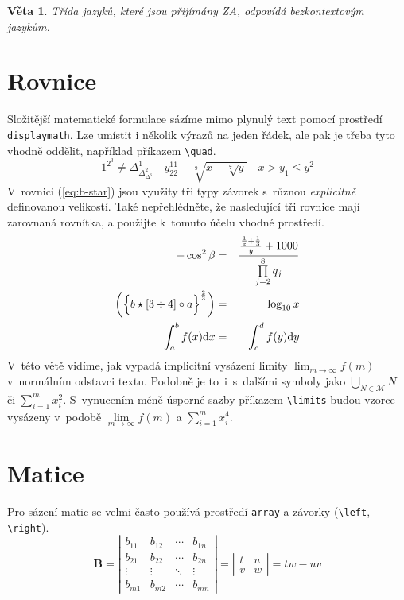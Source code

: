 \documentclass[a4paper, twocolumn, 11pt]{article}
\theoremstyle{plain}
\newtheorem{theorem}{Věta}
\begin{document}
\begin{theorem}

	Třída jazyků, které jsou přijímány ZA, odpovídá \emph{bezkontextovým jazykům.}

\end{theorem}

\section{Rovnice}

Složitější matematické formulace sázíme mimo plynulý text pomocí prostředí \texttt{displaymath}.
Lze umístit i několik výrazů na jeden řádek, ale pak je třeba tyto vhodně oddělit,
například příkazem \verb|\quad|.
%
\begin{displaymath}
	1^{2^3} \neq \Delta^1_{\Delta^2_{\Delta^3}} \quad
	y_{22}^{11} - \sqrt[9]{x + \sqrt[7]{y}} \quad
	x > y_1 \leq y^2
\end{displaymath}
%
\noindent
V~rovnici (\ref{eq:b-star}) jsou využity tři typy závorek s~různou \emph{explicitně} definovanou
velikostí. Také nepřehlédněte, že nasledující tři rovnice mají zarovnaná rovnítka, a použijte
k~tomuto účelu vhodné prostředí.
%
\begin{eqnarray}
	- \cos^2 \beta & = & \frac{\frac{\frac{1}{x} + \frac{1}{3}}{y} + 1000}{\prod\limits_{j=2}^8 q_j} \\
	\label{eq:b-star} \biggl( {\Bigl\{ b \star \left[ 3 \div 4 \right] \circ a \Bigr\}}^{\frac{2}{3}} \biggr) & = & \log_{10} x \\
	\label{eq:integ} \int_{a}^{b} f(x) \mathrm{d}x & = & \int_{c}^{d} f(y) \mathrm{d}y
\end{eqnarray}
%
\noindent
V~této větě vidíme, jak vypadá implicitní vysázení limity $\lim_{m\to\infty}f(m)$
v~normálním odstavci textu. Podobně je to~i~s~dalšími symboly jako
$\bigcup_{N \in \mathcal{M}} N$ či $\sum_{i=1}^{m} x_{i}^{2}$.
S~vynucením méně úsporné sazby příkazem \verb|\limits| budou vzorce vysázeny v~podobě
$\lim\limits_{m\to\infty} f(m)$ a $\sum\limits_{i=1}^{m} x_{i}^{4}$.

\section{Matice}

Pro sázení matic se velmi často používá prostředí \texttt{array}
a závorky (\verb|\left|, \verb|\right|).
%
\begin{displaymath}
	\mathbf{B} = \left| \begin{array}{cccc}
		b_{11} & b_{12} & \cdots & b_{1n} \\
		b_{21} & b_{22} & \cdots & b_{2n} \\
		\vdots & \vdots & \ddots & \vdots \\
		b_{m1} & b_{m2} & \cdots & b_{mn}
	\end{array} \right|
	= \left| \begin{array}{cc}
		t & u \\
		v & w
	\end{array} \right|
	= tw - uv
\end{displaymath}
\end{document}
